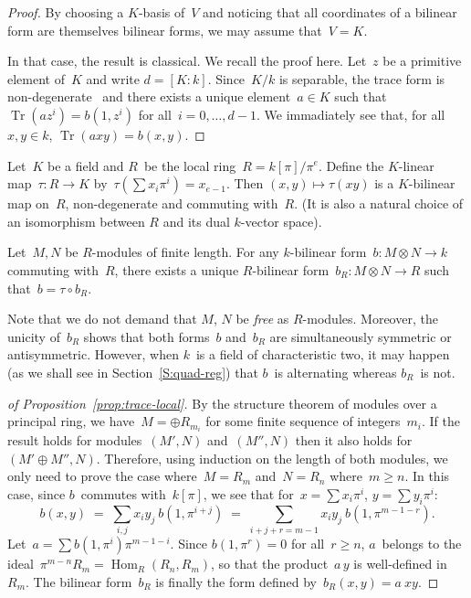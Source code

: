 \documentclass{lms}
\DeclareMathOperator\Hom{Hom}
\DeclareMathOperator\Tr{Tr}
\begin{document}
\begin{proof}
By choosing a $K$-basis of~$V$ and noticing that
all coordinates of a bilinear form are themselves bilinear forms,
we may assume that~$V = K$.

In that case, the result is classical. We recall the proof here.
Let~$z$ be a primitive element of~$K$ and write $d = [K:k]$.
Since~$K/k$ is separable, the trace form is
non-degenerate~\cite[VI~5.2]{lang-algebra}
and there exists a unique element~$a ∈ K$ such that
$\Tr (a z^i) = b(1, z^i)$ for all~$i=0, …, d-1$.
We immadiately see that, for all~$x, y ∈ k$, $\Tr (a x y) = b(x, y)$.

\end{proof}


Let~$K$ be a field and $R$~be the local ring~$R = k[π]/π^e$.
Define the $K$-linear map~$τ: R → K$ by~$τ(∑ x_i π^i) = x_{e-1}$.
Then $(x, y) ↦ τ(xy)$ is a $K$-bilinear map on~$R$,
non-degenerate and commuting with~$R$.
(It is also a natural choice of an isomorphism
between $R$ and its dual $k$-vector space).

\begin{prop}\label{prop:trace-local}
Let~$M, N$ be $R$-modules of finite length.
For any $k$-bilinear form~$b: M ⊗ N → k$ commuting with~$R$,
there exists a unique $R$-bilinear form~$b_R: M ⊗ N → R$
such that~$b = τ ∘ b_R$.
\end{prop}

Note that we do not demand that $M$, $N$ be \emph{free} as $R$-modules.
Moreover, the unicity of~$b_R$ shows that both forms~$b$ and~$b_R$ are
simultaneously symmetric or antisymmetric.
However, when $k$~is a field of characteristic two, it may happen (as we
shall see in Section~\ref{S:quad-reg}) that $b$~is alternating whereas
$b_R$~is not.

\begin{proof}[{of Proposition~\ref{prop:trace-local}}]
By the structure theorem of modules over a principal ring,
we have~$M = ⊕ R_{m_i}$ for some finite sequence of integers~$m_i$.
If the result holds for modules~$(M', N)$ and~$(M'', N)$ then
it also holds for~$(M' ⊕ M'', N)$.
Therefore, using induction on the length of both modules,
we only need to prove the case where~$M = R_m$ and~$N = R_n$ where~$m ≥ n$.
In this case, since $b$~commutes with~$k[π]$,
we see that for~$x = ∑ x_i π^i$, $y = ∑ y_i π^i$:
\begin{equation}
b(x,y) \;=\; ∑_{i,j} x_i y_j\: b(1, π^{i+j})
  \;=\; ∑_{i+j+r = m-1} x_i y_j\: b(1, π^{m-1-r}).
\end{equation}
Let~$a = ∑ b(1, π^{i}) π^{m-1-i}$. Since $b(1, π^{r}) = 0$ for all~$r ≥
n$, $a$~belongs to the ideal~$π^{m-n} R_m = \Hom_R (R_n, R_m)$, so that
the product~$a\,y$ is well-defined in~$R_m$. The bilinear form~$b_R$ is
finally the form defined by~$b_R(x,y) = a\:x y$.
\end{proof}
\end{document}
